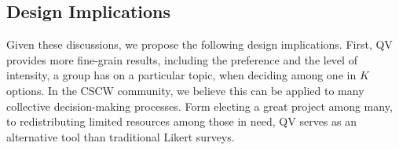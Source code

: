 \subsection{Design Implications}
Given these discussions, 
we propose the following design implications. 
First, QV provides more fine-grain results,
including the preference and the level of intensity,
a group has on a particular topic,
when deciding among one in $K$ options.
In the CSCW community,
we believe this can be applied to 
many collective decision-making processes.
Form electing a great project among many,
to redistributing limited resources among those in need,
QV serves as an alternative tool 
than traditional Likert surveys.
